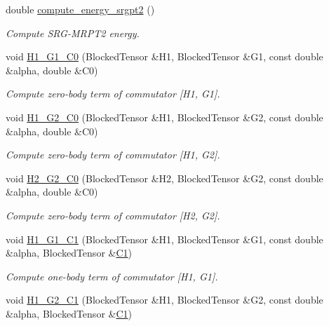 \begin{DoxyCompactItemize}
double \mbox{\hyperlink{classforte_1_1_m_r_d_s_r_g_a5f6e9cf959073b59cfe3d4a54df2cbfc}{compute\+\_\+energy\+\_\+srgpt2}} ()
\begin{DoxyCompactList}\small\item\em Compute S\+R\+G-\/\+M\+R\+P\+T2 energy. \end{DoxyCompactList}\item 
void \mbox{\hyperlink{classforte_1_1_m_r_d_s_r_g_a468b964dd4388b1d7da7708a1bfedd21}{H1\+\_\+\+G1\+\_\+\+C0}} (Blocked\+Tensor \&H1, Blocked\+Tensor \&G1, const double \&alpha, double \&C0)
\begin{DoxyCompactList}\small\item\em Compute zero-\/body term of commutator \mbox{[}H1, G1\mbox{]}. \end{DoxyCompactList}\item 
void \mbox{\hyperlink{classforte_1_1_m_r_d_s_r_g_a3f7cbb7f7c2d637302a525967c303fd1}{H1\+\_\+\+G2\+\_\+\+C0}} (Blocked\+Tensor \&H1, Blocked\+Tensor \&G2, const double \&alpha, double \&C0)
\begin{DoxyCompactList}\small\item\em Compute zero-\/body term of commutator \mbox{[}H1, G2\mbox{]}. \end{DoxyCompactList}\item 
void \mbox{\hyperlink{classforte_1_1_m_r_d_s_r_g_a1de2c9448d9e7f477e2713549c1b9d2e}{H2\+\_\+\+G2\+\_\+\+C0}} (Blocked\+Tensor \&H2, Blocked\+Tensor \&G2, const double \&alpha, double \&C0)
\begin{DoxyCompactList}\small\item\em Compute zero-\/body term of commutator \mbox{[}H2, G2\mbox{]}. \end{DoxyCompactList}\item 
void \mbox{\hyperlink{classforte_1_1_m_r_d_s_r_g_a9dbbb14d2b4d9159db8bee7ecb662c7c}{H1\+\_\+\+G1\+\_\+\+C1}} (Blocked\+Tensor \&H1, Blocked\+Tensor \&G1, const double \&alpha, Blocked\+Tensor \&\mbox{\hyperlink{namespaceforte_abe00ec86d0015c0f2b6ac298c6e428e4a1a2ddc2db4693cfd16d534cde5572cc1}{C1}})
\begin{DoxyCompactList}\small\item\em Compute one-\/body term of commutator \mbox{[}H1, G1\mbox{]}. \end{DoxyCompactList}\item 
void \mbox{\hyperlink{classforte_1_1_m_r_d_s_r_g_af172aec7d3475d3ea52bf3682cd78c2d}{H1\+\_\+\+G2\+\_\+\+C1}} (Blocked\+Tensor \&H1, Blocked\+Tensor \&G2, const double \&alpha, Blocked\+Tensor \&\mbox{\hyperlink{namespaceforte_abe00ec86d0015c0f2b6ac298c6e428e4a1a2ddc2db4693cfd16d534cde5572cc1}{C1}})

\end{DoxyCompactItemize}
